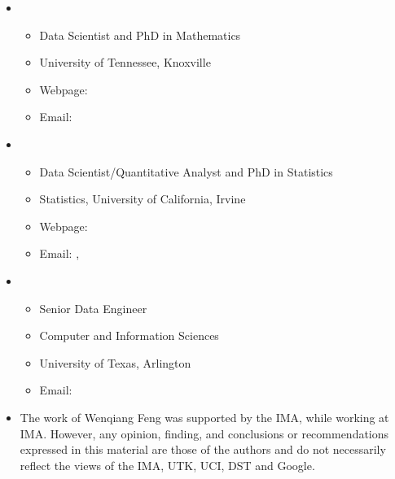 \documentclass[letterpaper,12pt,english]{sphinxmanual}
\begin{document}
\label{\detokenize{preface:about-the-authors}}\begin{itemize}
\item {} 
\begin{itemize}
\item {} 
Data Scientist and PhD in Mathematics

\item {} 
University of Tennessee, Knoxville

\item {} 
Webpage: 

\item {} 
Email: 

\end{itemize}

\item {} 
\begin{itemize}
\item {} 
Data Scientist/Quantitative Analyst and PhD in Statistics

\item {} 
Statistics, University of California, Irvine

\item {} 
Webpage: 

\item {} 
Email: , 

\end{itemize}

\item {} 
\begin{itemize}
\item {} 
Senior Data Engineer

\item {} 
Computer and Information Sciences

\item {} 
University of Texas, Arlington

\item {} 
Email: 

\end{itemize}

\item {} 

The work of Wenqiang Feng was supported by the IMA, while working at IMA. However, any opinion, finding, and conclusions or recommendations expressed in this material are those of the authors and do not necessarily reflect the views of the IMA, UTK, UCI, DST and Google.

\end{itemize}
\end{document}
